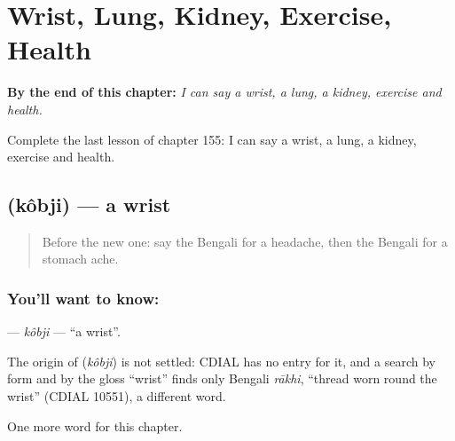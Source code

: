 
\chapter{Wrist, Lung, Kidney, Exercise, Health}
\label{ch:bn-wrist-lung-kidney-exercise-health}

\begin{chapteropening}
\textbf{By the end of this chapter:} \emph{I can say a wrist, a lung, a kidney, exercise and health.}

Complete the last lesson of chapter 155: I can say a wrist, a lung, a kidney, exercise and health.
\end{chapteropening}

\section[\texorpdfstring{\bn{কবজি} (kôbji)}{কবজি (kôbji)}]{ (kôbji) — a wrist}

\label{lesson:BN-C155-kobji}



\begin{quote}
Before the new one: say the Bengali for a headache, then the Bengali for a stomach ache.
\end{quote}

\subsection*{You'll want to know: }
\textbf{} — \emph{kôbji} — \textquotedblleft{}a wrist\textquotedblright{}.

\begin{cousinweb}
The origin of \textbf{} (\emph{kôbji}) is not settled: CDIAL has no entry for it, and a search by form and by the gloss \textquotedblleft{}wrist\textquotedblright{} finds only Bengali \emph{rākhi}, \textquotedblleft{}thread worn round the wrist\textquotedblright{} (CDIAL 10551), a different word.
\end{cousinweb}

\begin{grammarlens}[title={What you've built}]
One more word for this chapter.
\end{grammarlens}

